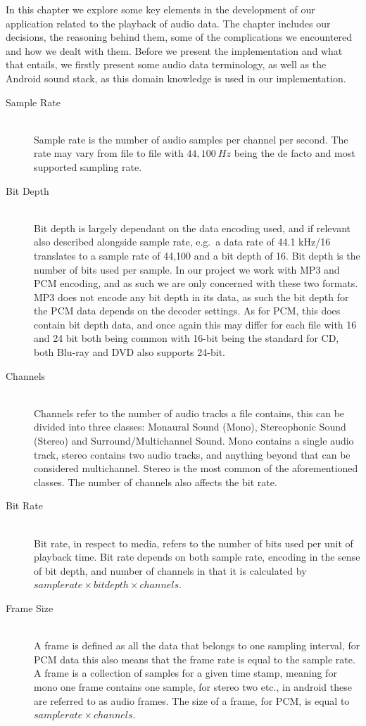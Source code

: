 In this chapter we explore some key elements in the development of our application related to the playback of audio data.
The chapter includes our decisions, the reasoning behind them, some of the complications we encountered and how we dealt with them.
Before we present the implementation and what that entails, we firstly present some audio data terminology, as well as the Android sound stack, as this domain knowledge is used in our implementation.

\begin{description}
    \item [Sample Rate]\cite{sample_rate_std} \hfill \\
    Sample rate is the number of audio samples per channel per second.
    The rate may vary from file to file with $44,100\ Hz$ being the de facto and most supported sampling rate.
    \item [Bit Depth]\cite{bit_depth} \hfill \\
    Bit depth is largely dependant on the data encoding used, and if relevant also described alongside sample rate, e.g.\ a data rate of 44.1 kHz/16 translates to a sample rate of 44,100 and a bit depth of 16.
    Bit depth is the number of bits used per sample.
    In our project we work with MP3 and PCM encoding, and as such we are only concerned with these two formats.
    MP3 does not encode any bit depth in its data, as such the bit depth for the \ac{PCM} data depends on the decoder settings.
    As for PCM, this does contain bit depth data, and once again this may differ for each file with 16 and 24 bit both being common with 16-bit being the standard for CD, both Blu-ray and DVD also supports 24-bit.
    \item [Channels]\cite{channels} \hfill \\
    Channels refer to the number of audio tracks a file contains, this can be divided into three classes: Monaural Sound (Mono), Stereophonic Sound (Stereo) and Surround/Multichannel Sound.
    Mono contains a single audio track, stereo contains two audio tracks, and anything beyond that can be considered multichannel.
    Stereo is the most common of the aforementioned classes.
    The number of channels also affects the bit rate.
    \item [Bit Rate]\cite{bit_rate} \hfill \\
    Bit rate, in respect to media, refers to the number of bits used per unit of playback time.
    Bit rate depends on both sample rate, encoding in the sense of bit depth, and number of channels in that it is calculated by $sample rate \times bit depth \times channels$.
    \item [Frame Size]\cite{audioformat} \hfill \\
    A frame is defined as all the data that belongs to one sampling interval, for PCM data this also means that the frame rate is equal to the sample rate.
    A frame is a collection of samples for a given time stamp, meaning for mono one frame contains one sample, for stereo two etc., in android these are referred to as audio frames.
    The size of a frame, for PCM, is equal to $sample rate \times channels$.
\end{description}

